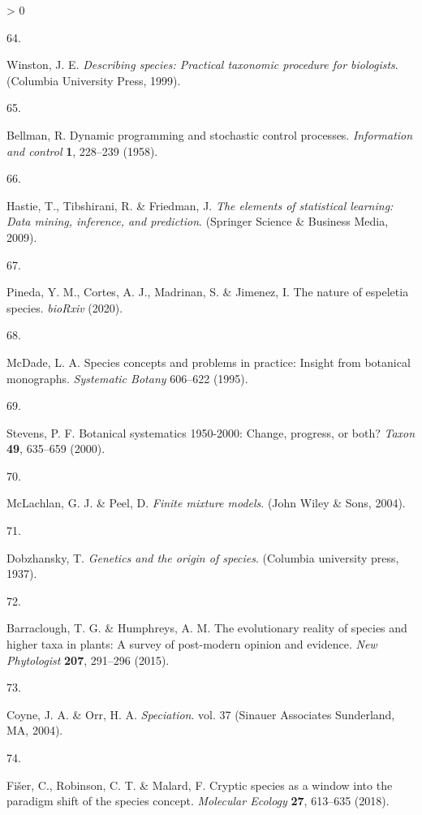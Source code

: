 \documentclass[
  11pt,
]{article}
\newlength{\cslhangindent}
\newlength{\csllabelwidth}
\newenvironment{CSLReferences}[2] %
 {%
  \setlength{\parindent}{0pt}
  \ifodd #1 \everypar{\setlength{\hangindent}{\cslhangindent}}\ignorespaces\fi
  \ifnum #2 > 0
  \setlength{\parskip}{#2\baselineskip}
  \fi
 }%
 {}
\newcommand{\CSLLeftMargin}[1]{\parbox[t]{\csllabelwidth}{#1}}
\newcommand{\CSLRightInline}[1]{\parbox[t]{\linewidth - \csllabelwidth}{#1}\break}
\begin{document}
\begin{CSLReferences}{0}{0}
\leavevmode\hypertarget{ref-winston1999describing}{}%
\CSLLeftMargin{64. }
\CSLRightInline{Winston, J. E. \emph{Describing species: Practical taxonomic procedure for biologists}. (Columbia University Press, 1999).}

\leavevmode\hypertarget{ref-bellman1958dynamic}{}%
\CSLLeftMargin{65. }
\CSLRightInline{Bellman, R. Dynamic programming and stochastic control processes. \emph{Information and control} \textbf{1}, 228--239 (1958).}

\leavevmode\hypertarget{ref-hastie2009elements}{}%
\CSLLeftMargin{66. }
\CSLRightInline{Hastie, T., Tibshirani, R. \& Friedman, J. \emph{The elements of statistical learning: Data mining, inference, and prediction}. (Springer Science \& Business Media, 2009).}

\leavevmode\hypertarget{ref-pineda2020nature}{}%
\CSLLeftMargin{67. }
\CSLRightInline{Pineda, Y. M., Cortes, A. J., Madrinan, S. \& Jimenez, I. The nature of espeletia species. \emph{bioRxiv} (2020).}

\leavevmode\hypertarget{ref-mcdade1995species}{}%
\CSLLeftMargin{68. }
\CSLRightInline{McDade, L. A. Species concepts and problems in practice: Insight from botanical monographs. \emph{Systematic Botany} 606--622 (1995).}

\leavevmode\hypertarget{ref-stevens2000botanical}{}%
\CSLLeftMargin{69. }
\CSLRightInline{Stevens, P. F. Botanical systematics 1950-2000: Change, progress, or both? \emph{Taxon} \textbf{49}, 635--659 (2000).}

\leavevmode\hypertarget{ref-mclachlan2004finite}{}%
\CSLLeftMargin{70. }
\CSLRightInline{McLachlan, G. J. \& Peel, D. \emph{Finite mixture models}. (John Wiley \& Sons, 2004).}

\leavevmode\hypertarget{ref-dobzhansky1937genetics}{}%
\CSLLeftMargin{71. }
\CSLRightInline{Dobzhansky, T. \emph{Genetics and the origin of species}. (Columbia university press, 1937).}

\leavevmode\hypertarget{ref-barraclough2015evolutionary}{}%
\CSLLeftMargin{72. }
\CSLRightInline{Barraclough, T. G. \& Humphreys, A. M. The evolutionary reality of species and higher taxa in plants: A survey of post-modern opinion and evidence. \emph{New Phytologist} \textbf{207}, 291--296 (2015).}

\leavevmode\hypertarget{ref-coyne2004speciation}{}%
\CSLLeftMargin{73. }
\CSLRightInline{Coyne, J. A. \& Orr, H. A. \emph{Speciation}. vol. 37 (Sinauer Associates Sunderland, MA, 2004).}

\leavevmode\hypertarget{ref-fivser2018cryptic}{}%
\CSLLeftMargin{74. }
\CSLRightInline{Fišer, C., Robinson, C. T. \& Malard, F. Cryptic species as a window into the paradigm shift of the species concept. \emph{Molecular Ecology} \textbf{27}, 613--635 (2018).}


\end{CSLReferences}
\end{document}
